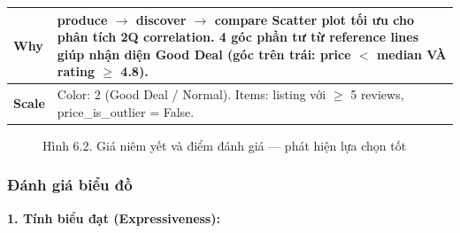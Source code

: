 \begin{table}[H]
\begin{tabularx}{\textwidth}{|l|l|X|}
\textbf{Why} & \multicolumn{2}{X|}{
\textbf{produce $\rightarrow$ discover $\rightarrow$ compare} \newline
Scatter plot tối ưu cho phân tích 2Q correlation. 4 góc phần tư từ reference lines giúp nhận diện Good Deal (góc trên trái: price $<$ median VÀ rating $\geq$ 4.8).
} \\ \hline
\textbf{Scale} & \multicolumn{2}{X|}{
Color: 2 (Good Deal / Normal). \newline
Items: listing với $\geq$ 5 reviews, price\_is\_outlier = False.
} \\ \hline
\end{tabularx}
\end{table}

\begin{figure}[H]
    \centering
    \caption{Hình 6.2. Giá niêm yết và điểm đánh giá --- phát hiện lựa chọn tốt}
    \label{fig:domain-task6-chart2}
\end{figure}

\subsubsection{Đánh giá biểu đồ}

\textbf{1. Tính biểu đạt (Expressiveness):}

